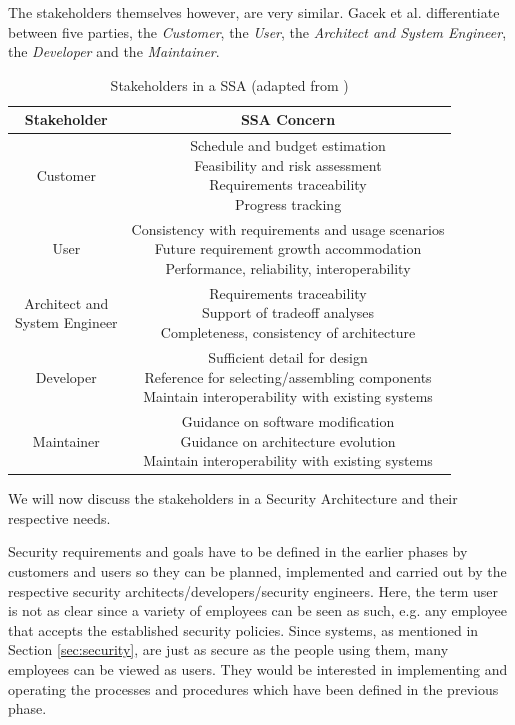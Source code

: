 The stakeholders themselves however, are very similar. Gacek et al. differentiate between five parties, the \textit{Customer}, the \textit{User}, the \textit{Architect and System Engineer}, the \textit{Developer} and the \textit{Maintainer}. 

\begin{table}[H]
\begin{tabular}{|c|c|}
\hline
Stakeholder & SSA Concern \\
\hline
Customer & \makecell{Schedule and budget estimation \\ Feasibility and risk assessment \\ Requirements traceability \\ Progress tracking} \\
\hline
User & \makecell{Consistency with requirements and usage scenarios \\ Future requirement growth accommodation \\ Performance, reliability, interoperability} \\
\hline
\makecell{Architect and \\ System Engineer} & \makecell{Requirements traceability \\ Support of tradeoff analyses \\ Completeness, consistency of architecture} \\
\hline
Developer & \makecell{Sufficient detail for design \\ Reference for selecting/assembling components \\ Maintain interoperability with existing systems} \\
\hline
Maintainer & \makecell{Guidance on software modification \\ Guidance on architecture evolution \\ Maintain interoperability with existing systems} \\
\hline
\end{tabular}     
\caption{Stakeholders in a SSA (adapted from \cite{Gacek95onthe})}
\end{table} 
\vspace{3mm}

We will now discuss the stakeholders in a Security Architecture and their respective needs. 

Security requirements and goals have to be defined in the earlier phases by customers and users so they can be planned, implemented and carried out by the respective security architects/developers/security engineers. Here, the term user is not as clear since a variety of employees can be seen as such, e.g. any employee that accepts the established security policies. Since systems, as mentioned in Section \ref{sec:security}, are just as secure as the people using them, many employees can be viewed as users. They would be interested in implementing and operating the processes and procedures which have been defined in the previous phase.

